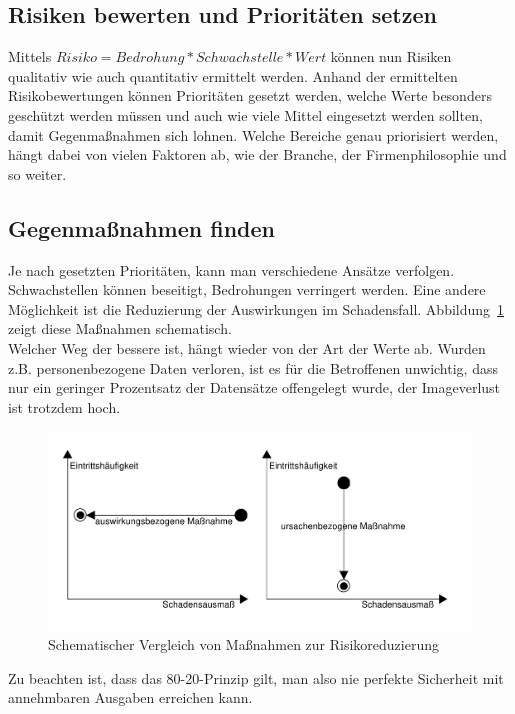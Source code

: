 \subsection{Risiken bewerten und Prioritäten setzen}
Mittels $ Risiko = Bedrohung * Schwachstelle * Wert $ können nun Risiken qualitativ wie auch quantitativ ermittelt werden. Anhand der ermittelten Risikobewertungen können Prioritäten gesetzt werden, welche Werte besonders geschützt werden müssen und auch wie viele Mittel eingesetzt werden sollten, damit Gegenmaßnahmen sich lohnen. Welche Bereiche genau priorisiert werden, hängt dabei von vielen Faktoren ab, wie der Branche, der Firmenphilosophie und so weiter.
\subsection{Gegenmaßnahmen finden}
Je nach gesetzten Prioritäten, kann man verschiedene Ansätze verfolgen. Schwachstellen können beseitigt, Bedrohungen verringert werden. Eine andere Möglichkeit ist die Reduzierung der Auswirkungen im Schadensfall. Abbildung~\ref{reduzierungHuefigkeitAusmass} zeigt diese Maßnahmen schematisch.\\
Welcher Weg der bessere ist, hängt wieder von der Art der Werte ab. Wurden z.B. personenbezogene Daten verloren, ist es für die Betroffenen unwichtig, dass nur ein geringer Prozentsatz der Datensätze offengelegt wurde, der Imageverlust ist trotzdem hoch.\\

\begin{figure}[h]
\includegraphics[scale=0.6]{images/reduzierungHuefigkeitAusmass.pdf}
\caption{Schematischer Vergleich von Maßnahmen zur Risikoreduzierung}
\label{reduzierungHuefigkeitAusmass}
\end{figure}

Zu beachten ist, dass das 80-20-Prinzip gilt, man also nie perfekte Sicherheit mit annehmbaren Ausgaben erreichen kann.